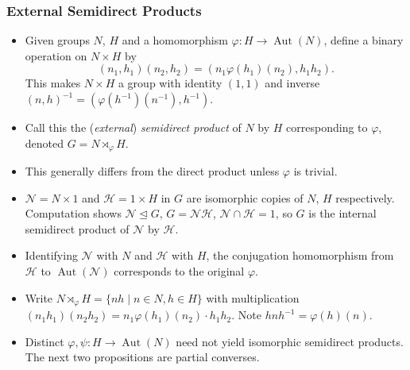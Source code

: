 \documentclass[../Odyssey_Project.tex]{subfiles}
\begin{document}
\subsubsection*{External Semidirect Products}
\begin{itemize}
    \item Given groups $N$, $H$ and a homomorphism $\varphi : H \to \operatorname{Aut}(N)$, define a binary operation on $N \times H$ by
    \[
    (n_1, h_1)(n_2, h_2) = (n_1 \varphi(h_1)(n_2), h_1 h_2).
    \]
    This makes $N \times H$ a group with identity $(1,1)$ and inverse $(n,h)^{-1} = (\varphi(h^{-1})(n^{-1}), h^{-1})$.
    \item Call this the (\emph{external}) \emph{semidirect product} of $N$ by $H$ corresponding to $\varphi$, denoted $G = N \rtimes_{\varphi} H$.
    \item This generally differs from the direct product unless $\varphi$ is trivial.
    \item $\mathcal{N} = N \times 1$ and $\mathcal{H} = 1 \times H$ in $G$ are isomorphic copies of $N$, $H$ respectively. Computation shows $\mathcal{N} \trianglelefteq G$, $G = \mathcal{NH}$, $\mathcal{N} \cap \mathcal{H} = 1$, so $G$ is the internal semidirect product of $\mathcal{N}$ by $\mathcal{H}$.
    \item Identifying $\mathcal{N}$ with $N$ and $\mathcal{H}$ with $H$, the conjugation homomorphism from $\mathcal{H}$ to $\operatorname{Aut}(\mathcal{N})$ corresponds to the original $\varphi$.
    \item Write $N \rtimes_{\varphi} H = \{nh \mid n \in N, h \in H\}$ with multiplication $(n_1 h_1)(n_2 h_2) = n_1 \varphi(h_1)(n_2) \cdot h_1 h_2$. Note $hnh^{-1} = \varphi(h)(n)$.
    \item Distinct $\varphi, \psi : H \to \operatorname{Aut}(N)$ need not yield isomorphic semidirect products. The next two propositions are partial converses.
\end{itemize}
\end{document}
